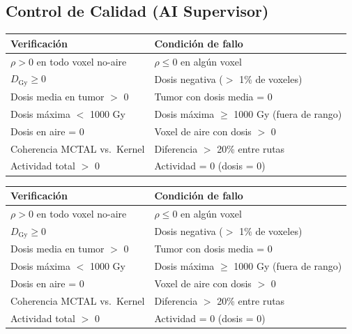 \documentclass[12pt,a4paper]{article}
\begin{document}
\begin{tcolorbox}[aiSupervisor]
\subsection*{Control de Calidad (AI Supervisor)}

\begin{tabular}{p{5cm} p{10cm}}
\toprule
\textbf{Verificación} & \textbf{Condición de fallo} \\
\midrule
$\rho > 0$ en todo voxel no-aire & $\rho \leq 0$ en algún voxel \\
$D_{\text{Gy}} \geq 0$ & Dosis negativa ($>$ 1\% de voxeles) \\
Dosis media en tumor $>$ 0 & Tumor con dosis media = 0 \\
Dosis máxima $<$ 1000 Gy & Dosis máxima $\geq$ 1000 Gy (fuera de rango) \\
Dosis en aire = 0 & Voxel de aire con dosis $>$ 0 \\
Coherencia MCTAL vs.\ Kernel & Diferencia $>$ 20\% entre rutas \\
Actividad total $>$ 0 & Actividad = 0 (dosis = 0) \\
\bottomrule
\end{tabular}

\newpage




\begin{tabular}{p{5cm} p{10cm}}
\toprule
\textbf{Verificación} & \textbf{Condición de fallo} \\
\midrule
$\rho > 0$ en todo voxel no-aire & $\rho \leq 0$ en algún voxel \\
$D_{\text{Gy}} \geq 0$ & Dosis negativa ($>$ 1\% de voxeles) \\
Dosis media en tumor $>$ 0 & Tumor con dosis media = 0 \\
Dosis máxima $<$ 1000 Gy & Dosis máxima $\geq$ 1000 Gy (fuera de rango) \\
Dosis en aire = 0 & Voxel de aire con dosis $>$ 0 \\
Coherencia MCTAL vs.\ Kernel & Diferencia $>$ 20\% entre rutas \\
Actividad total $>$ 0 & Actividad = 0 (dosis = 0) \\
\bottomrule
\end{tabular}

\newpage

\end{tcolorbox}
\end{document}
